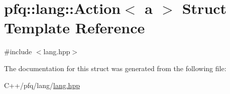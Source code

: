 \hypertarget{structpfq_1_1lang_1_1Action}{\section{pfq\+:\+:lang\+:\+:Action$<$ a $>$ Struct Template Reference}
\label{structpfq_1_1lang_1_1Action}
}


{\ttfamily \#include $<$lang.\+hpp$>$}



The documentation for this struct was generated from the following file\+:\begin{DoxyCompactItemize}
\item 
C++/pfq/lang/\hyperlink{lang_8hpp}{lang.\+hpp}\end{DoxyCompactItemize}
